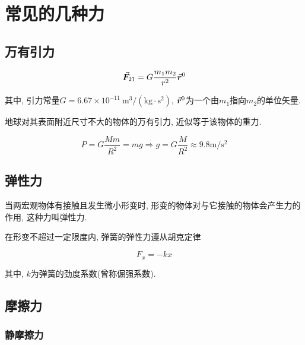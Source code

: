 \section{常见的几种力} \label{2.2}

\subsection{万有引力}

\begin{equation}
	\va*{F}_{21} = G \dfrac{m_1 m_2}{r^2} \va*{r}^0
	\label{C2-eq8}
\end{equation}

其中, 引力常量$G = 6.67 \times 10^{-11} ~ \mathrm{m}^3 / (\mathrm{kg} \cdot \mathrm{s}^2)$, $\va*{r}^0$为一个由$m_1$指向$m_2$的单位矢量. 

地球对其表面附近尺寸不大的物体的万有引力, 近似等于该物体的重力. 

\begin{equation}
	P = G \dfrac{Mm}{R^2} = mg 
	\Longrightarrow g = G \dfrac{M}{R^2} \approx 9.8 \mathrm{m}/\mathrm{s}^2 
	\label{C2-eq9}
\end{equation}

\subsection{弹性力}

\begin{definition}[弹性力] \label{C2-df1}
	
	当两宏观物体有接触且发生微小形变时, 形变的物体对与它接触的物体会产生力的作用, 这种力叫弹性力. 
	
	在形变不超过一定限度内, 弹簧的弹性力遵从胡克定律
	
	\begin{equation}
		F_x = -kx \label{C2-eq10}
	\end{equation}
	
	其中, $k$为弹簧的劲度系数(曾称倔强系数). 
	
\end{definition}

\subsection{摩擦力}

\subsubsection{静摩擦力}


